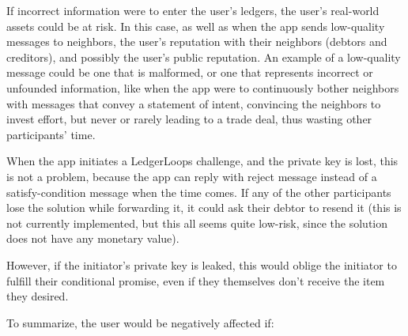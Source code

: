 \documentclass[11pt,twoside,a4paper]{article}
\begin{document}
If incorrect information were to enter the user's ledgers, the user's real-world assets could be at risk.
In this case, as well as when the app sends low-quality messages to neighbors, the user's reputation with their neighbors (debtors and creditors), and possibly the user's public reputation. An example of a low-quality message could be one that is malformed, or one that represents incorrect or unfounded information, like when the app were to continuously bother neighbors with messages that convey a statement of intent, convincing the neighbors to invest effort, but never or rarely leading to a trade deal, thus wasting other participants' time.

When the app initiates a LedgerLoops challenge, and the private key is lost, this is not a problem, because the app can reply with reject message instead of a satisfy-condition message when the time comes. If any of the other participants lose the solution while forwarding it, it could ask their debtor to resend it (this is not currently implemented, but this all seems quite low-risk, since the solution does not have any monetary value).

However, if the initiator's private key is leaked, this would oblige the initiator to fulfill their conditional promise, even if they themselves don't receive the item they desired.

To summarize, the user would be negatively affected if:
\end{document}
